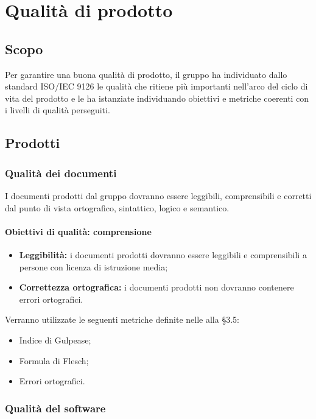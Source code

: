 \documentclass[PianoDiQualifica.tex]{subfiles}
\begin{document}
\chapter{Qualità di prodotto}

\section{Scopo}
Per garantire una buona qualità di prodotto, il gruppo \gruppo ha individuato dallo standard ISO/IEC 9126 le qualità che ritiene più importanti nell’arco del ciclo di vita del prodotto e le ha istanziate individuando obiettivi e metriche coerenti con i livelli di qualità perseguiti.

\section{Prodotti}

\subsection{Qualità dei documenti}
I documenti prodotti dal gruppo \gruppo dovranno essere leggibili, comprensibili e corretti dal punto di vista ortografico, sintattico, logico e semantico.
\subsubsection {Obiettivi di qualità: comprensione}
\begin{itemize}
	\item \textbf{Leggibilità:} i documenti prodotti dovranno essere leggibili e comprensibili a persone con licenza di istruzione media;
	\item \textbf{Correttezza ortografica:} i documenti prodotti non dovranno contenere errori ortografici.
\end{itemize}
Verranno utilizzate le seguenti metriche definite nelle \ndp alla \S{3.5}:
\begin{itemize}
	\item {} Indice di Gulpease;
	\item {} Formula di Flesch;
	\item {} Errori ortografici.
\end{itemize}

\subsection{Qualità del software}
\end{document}
